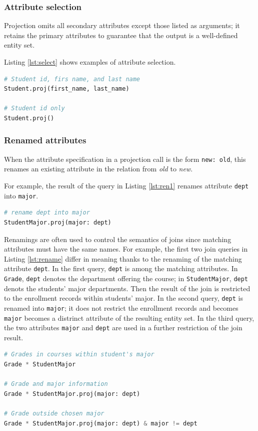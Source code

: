 \documentclass[letter,10pt]{article}
\begin{document}
\subsubsection{Attribute selection}
Projection omits all secondary attributes except those listed as arguments;
it retains the primary attributes to guarantee that the output is a well-defined entity set.

Listing \ref{lst:select} shows examples of attribute selection.
\begin{lstlisting}[language=Python, caption={Selecting  attributes.}, label={lst:select}]
# Student id, firs name, and last name
Student.proj(first_name, last_name)

# Student id only
Student.proj()
\end{lstlisting}

\subsubsection{Renamed attributes}
When the attribute specification in a projection call is the form \lstinline$new: old$, this renames an existing attribute in the relation from \emph{old} to \emph{new}.

For example, the result of the query in Listing \ref{lst:ren1} renames attribute \lstinline$dept$ into \lstinline$major$.
\begin{lstlisting}[language=Python, caption={Renaming attributes.}, label={lst:ren1}]
# rename dept into major
StudentMajor.proj(major: dept)
\end{lstlisting}

Renamings are often used to control the semantics of joins since matching attributes must have the same names. 
For example, the first two join queries in Listing \ref{lst:rename} differ in meaning thanks to the renaming of the matching attribute \lstinline$dept$.
In the first query, \lstinline$dept$ is among the matching attributes. In \lstinline$Grade$, \lstinline$dept$ denotes the department offering the course; in \lstinline$StudentMajor$, \lstinline$dept$ denots the students' major departments. Then the result of the join is restricted to the  enrollment records within students' major.
In the second query, \lstinline$dept$ is renamed into \lstinline$major$; it does not restrict the enrollment records and becomes \lstinline$major$ becomes a distrinct attribute of the resulting entity set. 
In the third query, the two attributes \lstinline$major$ and \lstinline$dept$ are used in a further restriction of the join result.
\begin{lstlisting}[language=Python, caption={Renaming attributes.}, label={lst:rename}]
# Grades in courses within student's major 
Grade * StudentMajor

# Grade and major information 
Grade * StudentMajor.proj(major: dept)

# Grade outside chosen major
Grade * StudentMajor.proj(major: dept) & major != dept
\end{lstlisting}
\end{document}

